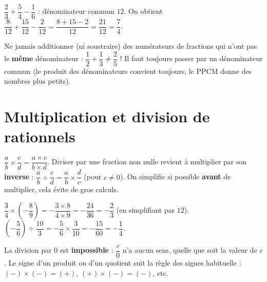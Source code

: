 \begin{illus}
\end{illus}

\begin{exemple}
$\dfrac23+\dfrac54-\dfrac16$ : dénominateur commun $12$. On obtient
$\dfrac8{12}+\dfrac{15}{12}-\dfrac2{12}=\dfrac{8+15-2}{12}=\dfrac{21}{12}=\dfrac74$.
\end{exemple}

\begin{aretenir}
Ne jamais additionner (ni soustraire) des numérateurs de fractions qui n'ont pas le
\textbf{même} dénominateur : $\dfrac12+\dfrac13\ne\dfrac25$ ! Il faut toujours passer par un
dénominateur commun (le produit des dénominateurs convient toujours, le PPCM donne des
nombres plus petits).
\end{aretenir}

\section{Multiplication et division de rationnels}

\begin{propriete}
$\dfrac ab\times\dfrac cd=\dfrac{a\times c}{b\times d}$. Diviser par une fraction non nulle
revient à multiplier par son \textbf{inverse} :
$\dfrac ab\div\dfrac cd=\dfrac ab\times\dfrac dc$ (pour $c\ne0$). On simplifie si possible
\textbf{avant} de multiplier, cela évite de gros calculs.
\end{propriete}

\begin{exemple}
$\dfrac34\times\left(-\dfrac89\right)=-\dfrac{3\times8}{4\times9}=-\dfrac{24}{36}=-\dfrac23$
(en simplifiant par $12$). \quad
$\left(-\dfrac56\right)\div\dfrac{10}3=-\dfrac56\times\dfrac3{10}=-\dfrac{15}{60}=-\dfrac14$.
\end{exemple}

\begin{remarque}
La division par $0$ est \textbf{impossible} : $\dfrac c0$ n'a aucun sens, quelle que soit la
valeur de $c$. Le signe d'un produit ou d'un quotient suit la règle des signes habituelle :
$(-)\times(-)=(+)$, $(+)\times(-)=(-)$, etc.
\end{remarque}

